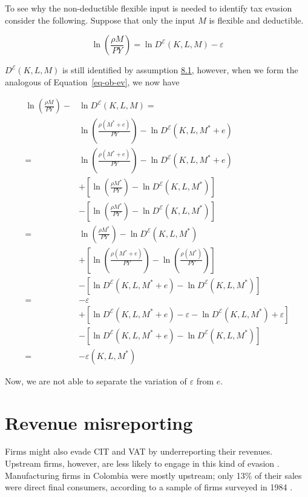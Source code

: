 \documentclass[
  12pt]{article}
\theoremstyle{definition}
\theoremstyle{remark}
\begin{document}
To see why the non-deductible flexible input is needed to identify tax
evasion consider the following. Suppose that only the input \(M\) is
flexible and deductible.

\[
\ln\left(\frac{\rho M}{PY}\right)=\ln D^{\mathcal{E}}(K,L,M)-\varepsilon
\]

\(D^{\mathcal{E}}(K,L,M)\) is still identified by assumption
\hyperref[ass-non-ev]{8.1}, however, when we form the analogous of
Equation~\ref{eq-ob-ev}, we now have

\[
\begin{aligned}
\ln\left(\frac{\rho M}{PY}\right)-&\ln D^{\mathcal{E}}(K,L,M)=\\
&\ln\left(\frac{\rho(M^*+e)}{PY}\right)-\ln D^{\mathcal{E}}(K,L,M^*+e)\\
=&\ln\left(\frac{\rho(M^*+e)}{PY}\right)-\ln D^{\mathcal{E}}(K,L,M^*+e)\\
&+\left[\ln\left(\frac{\rho M^*}{PY}\right)-\ln D^{\mathcal{E}}(K,L,M^*)\right]\\
&-\left[\ln\left(\frac{\rho M^*}{PY}\right)-\ln D^{\mathcal{E}}(K,L,M^*)\right] \\
=&\ln\left(\frac{\rho M^*}{PY}\right)-\ln D^{\mathcal{E}}(K,L,M^*) \\
&+\left[\ln\left(\frac{\rho(M^*+e)}{PY}\right)-\ln\left(\frac{\rho(M^*)}{PY}\right)\right]\\
&-\left[\ln D^{\mathcal{E}}(K,L,M^*+e)-\ln D^{\mathcal{E}}(K,L,M^*)\right]\\
=& -\varepsilon \\
&+\left[\ln D^{\mathcal{E}}(K,L,M^*+e)-\varepsilon-\ln D^{\mathcal{E}}(K,L,M^*)+\varepsilon\right]\\
&-\left[\ln D^{\mathcal{E}}(K,L,M^*+e)-\ln D^{\mathcal{E}}(K,L,M^*)\right]\\
=& -\varepsilon(K,L,M^*)
\end{aligned}
\]

Now, we are not able to separate the variation of \(\varepsilon\) from
\(e\).

\section{Revenue misreporting}\label{revenue-misreporting}

Firms might also evade CIT and VAT by underreporting their revenues.
Upstream firms, however, are less likely to engage in this kind of
evasion \citep{Almunia2018}. Manufacturing firms in Colombia were mostly
upstream; only 13\% of their sales were direct final consumers,
according to a sample of firms surveyed in 1984 \citep{Perry1990}.
\end{document}
